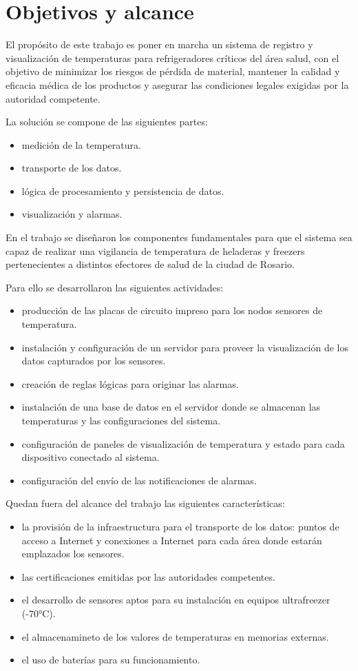 \section{Objetivos y alcance}
\label{objetivos}
El propósito de este trabajo es poner en marcha un sistema de registro y visualización de temperaturas para refrigeradores críticos del área salud, con el objetivo de minimizar los riesgos de pérdida de material, mantener la calidad y eficacia médica de los productos y asegurar las condiciones legales exigidas por la autoridad competente.

La solución se compone de las siguientes partes:
\begin{itemize}
\item medición de la temperatura.
\item transporte de los datos.
\item lógica de procesamiento y persistencia de datos.
\item visualización y alarmas.
\end{itemize}


En el trabajo se diseñaron los componentes fundamentales para que el sistema sea capaz de realizar una vigilancia de temperatura de heladeras y freezers pertenecientes a distintos efectores de salud de la ciudad de Rosario. 

Para ello se desarrollaron las siguientes actividades:

\begin{itemize}
\item producción de las placas de circuito impreso para los nodos sensores de temperatura.
\item instalación y configuración de un servidor para proveer la visualización de los datos capturados por los sensores.
\item creación de reglas lógicas para originar las alarmas.
\item instalación de una base de datos en el servidor donde se almacenan las temperaturas y las configuraciones del sistema.
\item configuración de paneles de visualización de temperatura y estado para cada dispositivo conectado al sistema.
\item configuración del envío de las notificaciones de alarmas.
\end{itemize}

Quedan fuera del alcance del trabajo las siguientes características:
\begin{itemize}
\item la provisión de la infraestructura para el transporte de los datos: puntos de acceso a Internet y conexiones a Internet para cada área donde estarán emplazados los sensores.
\item las certificaciones emitidas por las autoridades competentes.
\item el desarrollo de sensores aptos para su instalación en equipos ultrafreezer (-70°C).
\item el almacenamineto de los valores de temperaturas en memorias externas.
\item el uso de baterías para su funcionamiento.
\end{itemize}



